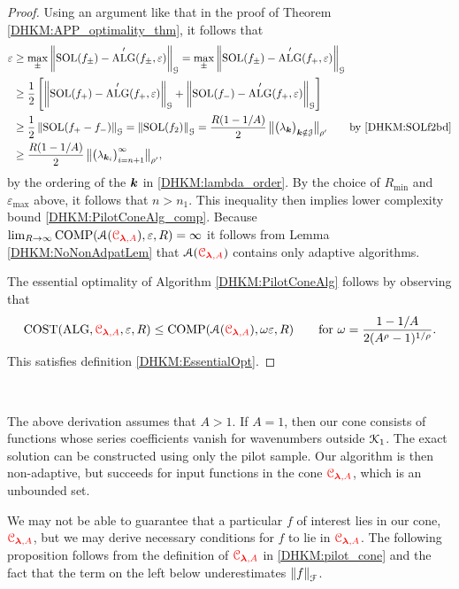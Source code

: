 \documentclass[USenglish]{article}
\theoremstyle{dgthm}
\theoremstyle{dgthm}
\theoremstyle{dgthm}
\theoremstyle{dgthm}
\theoremstyle{dgdef}
\theoremstyle{definition}
\DeclareMathOperator{\SOL}{SOL}
\DeclareMathOperator{\ALG}{ALG}
\DeclareMathOperator{\COST}{COST}
\DeclareMathOperator{\COMP}{COMP}
\newcommand{\norm}[2][{}]{\ensuremath{\left \lVert #2 \right \rVert}_{#1}}
\newcommand{\bignorm}[2][{}]{\ensuremath{\bigl \lVert #2 \bigr \rVert}_{#1}}
\newcommand{\DHKMchange}[1]{{\color{red}{#1}}}
\begin{document}
\begin{proof}
Using an argument like that in the proof of  Theorem \ref{DHKM:APP_optimality_thm}, it follows that 
\begin{align*}
\varepsilon & \ge \max_{\pm} \norm[\calG]{\SOL(f_{\pm}) - \ALG'(f_{\pm},\varepsilon)} 
=  \max_{\pm} \norm[\calG]{\SOL(f_{\pm}) - \ALG'(f_{+},\varepsilon)} \\
& \ge \frac 12 \left [ \norm[\calG]{\SOL(f_{+}) - \ALG'(f_{+},\varepsilon)} 
+ \norm[\calG]{\SOL(f_{-}) - \ALG'(f_{+},\varepsilon)}  \right] \\
& \ge \frac 12 \norm[\calG]{\SOL(f_+ - f_-)} = \norm[\calG]{\SOL(f_2)} 
=\frac{R(1 - 1/A)}{2} \, \bignorm[\rho']{\bigl(  \lambda_{\bsk}  \bigr)_{\bsk \notin \calJ}} \qquad \text{by \eqref{DHKM:SOLf2bd}} \\
& \ge \frac{R(1 - 1/A)}{2} \, \bignorm[\rho']{\bigl(  \lambda_{\bsk_i}  \bigr)_{i = n+1}^\infty},
\end{align*}
by the ordering of the ${\boldsymbol{k}}$ in \eqref{DHKM:lambda_order}.  By the choice of $R_{\min}$ and $\varepsilon_{\max}$ above, it follows that $n > n_1$.  This inequality then implies lower complexity bound \eqref{DHKM:PilotConeAlg_comp}. Because $\lim_{R \to \infty} \COMP(\calA(\DHKMchange{\calC_{\boldsymbol{\lambda},A}}), \varepsilon,R) = \infty$  it follows from Lemma \ref{DHKM:NoNonAdpatLem} that $\calA(\DHKMchange{\calC_{\boldsymbol{\lambda},A}})$ contains only adaptive algorithms.

The essential optimality of Algorithm \ref{DHKM:PilotConeAlg} follows by observing that 
\[
\COST(\ALG,\DHKMchange{\calC_{\boldsymbol{\lambda},A}},\varepsilon,R) \le \COMP(\calA(\DHKMchange{\calC_{\boldsymbol{\lambda},A}}),\omega \varepsilon,R) \qquad \text{for } \omega = \frac{1-1/A}{2(A^\rho -1)^{1/\rho}}.
\]
This satisfies definition \eqref{DHKM:EssentialOpt}.  
\end{proof} \

The above derivation assumes that $A > 1$.  If $A =1$, then our cone consists of functions whose series coefficients vanish for wavenumbers outside ${\mathcal{K}}_1$.  The exact solution can be constructed using only the pilot sample.  Our algorithm is then non-adaptive, but succeeds for input functions in the cone $\DHKMchange{\calC_{\boldsymbol{\lambda},A}}$, which is an unbounded set.

We may not be able to guarantee that a particular $f$ of interest lies in our cone, $\DHKMchange{\calC_{\boldsymbol{\lambda},A}}$, but we may derive necessary conditions for $f$ to lie in $\DHKMchange{\calC_{\boldsymbol{\lambda},A}}$.  The following proposition follows from the definition of $\DHKMchange{\calC_{\boldsymbol{\lambda},A}}$ in \eqref{DHKM:pilot_cone} and the fact that the term on the left below underestimates $\norm[\calF]{f}$.
\end{document}
